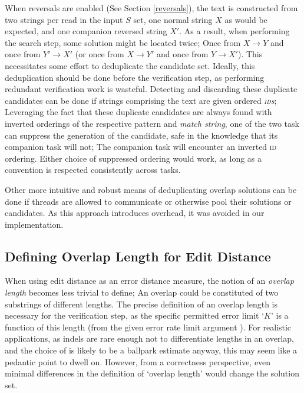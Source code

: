 When reversals are enabled (See Section \ref{reversals}), the \gls{text} is constructed from two strings per read in the input $S$ set, one normal string $X$ as would be expected, and one companion reversed string $X'$. As a result, when performing the \gls{search step}, some \gls{solution} might be located twice; Once from $X \rightarrow Y$ and once from $Y' \rightarrow X'$ (or once from $X \rightarrow Y'$ and once from $Y \rightarrow X'$). This necessitates some effort to deduplicate the \gls{candidate} set. Ideally, this deduplication should be done before the \gls{verification step}, as performing redundant verification work is wasteful. Detecting and discarding these duplicate candidates can be done if strings comprising the \gls{text} are given ordered \textit{\textsc{id}s}; Leveraging the fact that these duplicate candidates are always found with inverted orderings of the respective \gls{pattern} and \textit{match string}, one of the two \gls{task} can suppress the generation of the candidate, safe in the knowledge that its companion task will not; The companion task will encounter an inverted \textsc{id} ordering. Either choice of suppressed ordering would work, as long as a convention is respected consistently across tasks.
 
Other more intuitive and robust means of deduplicating overlap solutions can be done if threads are allowed to communicate or otherwise pool their solutions or candidates. As this approach introduces overhead, it was avoided in our implementation.





\subsection{Defining Overlap Length for Edit Distance}

When using \gls{edit distance} as an \gls{error distance} measure, the notion of an \textit{overlap length} becomes less trivial to define; An overlap could be constituted of two substrings of different lengths. The precise definition of an overlap length is necessary for the \gls{verification step}, as the specific permitted error limit `$K$' is a function of this length (from the given error rate limit argument ). For realistic applications, as \glspl{indel} are rare enough not to differentiate lengths in an overlap, and the choice of  is likely to be a ballpark estimate anyway, this may seem like a pedantic point to dwell on. However, from a correctness perspective, even minimal differences in the definition of `overlap length' would change the \gls{solution} set.

